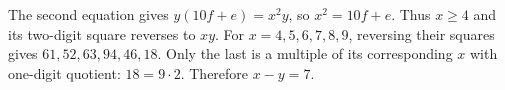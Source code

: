 The second equation gives $y(10f+e)=x^2y$, so $x^2=10f+e$. Thus $x\ge4$ and its two-digit square reverses to $xy$. For $x=4,5,6,7,8,9$, reversing their squares gives $61,52,63,94,46,18$. Only the last is a multiple of its corresponding $x$ with one-digit quotient: $18=9\cdot2$. Therefore $\boxed{x-y=7}$.
